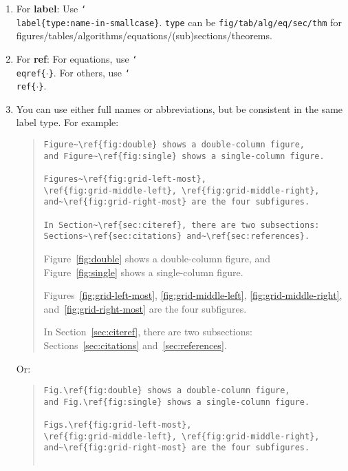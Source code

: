 \begin{enumerate}
  \item
    For \textbf{label}: Use \texttt{\char`\\label\{type:name-in-smallcase\}}.
    \texttt{type} can be \texttt{fig/tab/alg/eq/sec/thm} for figures/tables/algorithms/equations/(sub)sections/theorems.

  \item For \textbf{ref}:
    For equations, use \texttt{\char`\\eqref\{$\cdot$\}}. For others, use \texttt{\char`\\ref\{$\cdot$\}}.

  \item
    You can use either full names or abbreviations, but be consistent in the same label type.
    For example:
  \begin{quote}\begin{scriptsize}
    \begin{verbatim}
Figure~\ref{fig:double} shows a double-column figure,
and Figure~\ref{fig:single} shows a single-column figure.

Figures~\ref{fig:grid-left-most},
\ref{fig:grid-middle-left}, \ref{fig:grid-middle-right},
and~\ref{fig:grid-right-most} are the four subfigures.

In Section~\ref{sec:citeref}, there are two subsections:
Sections~\ref{sec:citations} and~\ref{sec:references}.
    \end{verbatim}
     Figure~\ref{fig:double} shows a double-column figure, and Figure~\ref{fig:single} shows a single-column figure.

    Figures~\ref{fig:grid-left-most}, \ref{fig:grid-middle-left}, \ref{fig:grid-middle-right}, and~\ref{fig:grid-right-most} are the four subfigures.

    In Section~\ref{sec:citeref}, there are two subsections: Sections~\ref{sec:citations} and~\ref{sec:references}.
  \end{scriptsize}\end{quote}

    Or:
  \begin{quote}\begin{scriptsize}
    \begin{verbatim}
Fig.\ref{fig:double} shows a double-column figure,
and Fig.\ref{fig:single} shows a single-column figure.

Figs.\ref{fig:grid-left-most},
\ref{fig:grid-middle-left}, \ref{fig:grid-middle-right},
and~\ref{fig:grid-right-most} are the four subfigures.


\end{verbatim}
\end{scriptsize}
\end{quote}
\end{enumerate}
